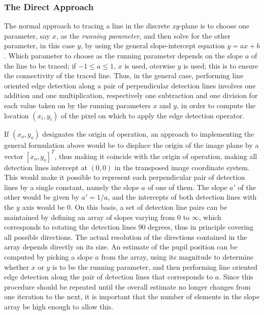 \subsubsection{The Direct Approach}

The normal approach to tracing a line in the discrete {\em xy\/}-plane
is to choose one parameter, say $x$, as the {\em running parameter\/},
and then solve for the other parameter, in this case $y$, by using the
general slope-intercept equation $y=ax+b$.  Which parameter to choose
as the running parameter depends on the slope $a$ of the line to be
traced; if $-1\leq a\leq 1$, $x$ is used, oterwise $y$ is used; this
is to ensure the connectivity of the traced line.  Thus, in the
general case, performing line oriented edge detection along a pair of
perpendicular detection lines involves one addition and one
multiplication, respectively one subtraction and one division for each
value taken on by the running parameters $x$ and $y$, in order to
compute the location $(x_{i},y_{i})$ of the pixel on which to apply
the edge detection operator.

If $(x_{o},y_{o})$ designates the origin of operation, an approach to
implementing the general formulation above would be to displace the
origin of the image plane by a vector $[x_{o},y_{o}]^{T}$, thus making
it coincide with the origin of operation, making all detection lines
intercept at $(0,0)$ in the transposed image coordinate system.  This
would make it possible to represent each perpendicular pair of
detection lines by a single constant, namely the slope $a$ of one of
them.  The slope $a'$ of the other would be given by $a'=1/a$, and the
intercepts of both detection lines with the $y$ axis would be 0.  On
this basis, a set of detection line pairs can be maintained by
defining an array of slopes varying from 0 to $\infty$, which
corresponds to rotating the detection lines 90 degrees, thus in
principle covering all possible directions.  The actual resolution of
the directions contained in the array depends directly on its size.
An estimate of the pupil position can be computed by picking a slope
$a$ from the array, using its magnitude to determine whether $x$ or
$y$ is to be the running parameter, and then performing line oriented
edge detection along the pair of detection lines that corresponds to
$a$.  Since this procedure should be repeated until the overall
estimate no longer changes from one iteration to the next, it is
important that the number of elements in the slope array be high
enough to allow this.

